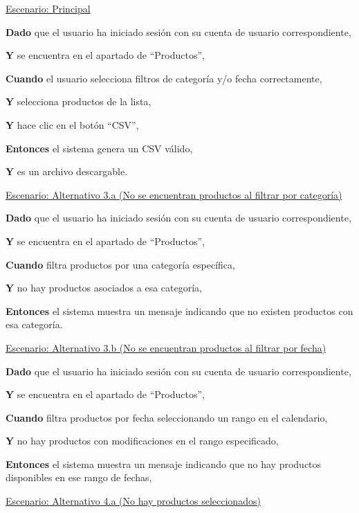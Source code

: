 
\underline{Escenario: Principal}\par
\textbf{Dado} que el usuario ha iniciado sesión con su cuenta de usuario correspondiente,\par
\textbf{Y} se encuentra en el apartado de \enquote{Productos},\par
\textbf{Cuando} el usuario selecciona filtros de categoría y/o fecha correctamente,\par
\textbf{Y} selecciona productos de la lista,\par
\textbf{Y} hace clic en el botón \enquote{CSV},\par
\textbf{Entonces} el sistema genera un CSV válido,\par
\textbf{Y} es un archivo descargable.\par
\vspace{0.15cm}
\underline{Escenario: Alternativo 3.a (No se encuentran productos al filtrar por categoría)}\par
\textbf{Dado} que el usuario ha iniciado sesión con su cuenta de usuario correspondiente,\par
\textbf{Y} se encuentra en el apartado de \enquote{Productos},\par 
\textbf{Cuando} filtra productos por una categoría específica,\par
\textbf{Y} no hay productos asociados a esa categoría,\par 
\textbf{Entonces} el sistema muestra un mensaje indicando que no existen productos con esa categoría.\par
\vspace{0.15cm}
\underline{Escenario: Alternativo 3.b (No se encuentran productos al filtrar por fecha)}\par
\textbf{Dado} que el usuario ha iniciado sesión con su cuenta de usuario correspondiente,\par
\textbf{Y} se encuentra en el apartado de \enquote{Productos},\par 
\textbf{Cuando} filtra productos por fecha seleccionando un rango en el calendario,\par 
\textbf{Y} no hay productos con modificaciones en el rango especificado,\par
\textbf{Entonces} el sistema muestra un mensaje indicando que no hay productos disponibles en ese rango de fechas,\par
\vspace{0.15cm}
\underline{Escenario: Alternativo 4.a (No hay productos seleccionados)}\par
